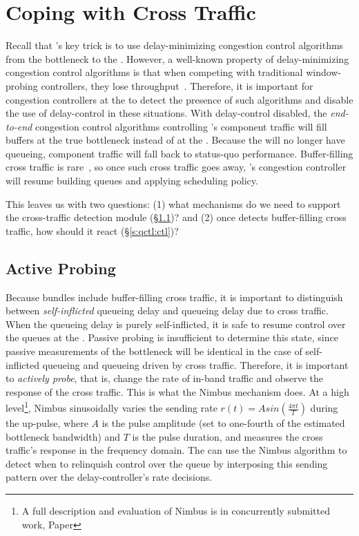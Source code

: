 \section{Coping with Cross Traffic}\label{s:queue-ctl}

Recall that \name's key trick is to use delay-minimizing congestion control algorithms from the bottleneck to the \inbox.
However, a well-known property of delay-minimizing congestion control algorithms is that when competing with traditional window-probing controllers, they lose throughput~\cite{copa}.
Therefore, it is important for congestion controllers at the \inbox to detect the presence of such algorithms and disable the use of delay-control in these situations.
With delay-control disabled, the \emph{end-to-end} congestion control algorithms controlling \name's component traffic will fill buffers at the true bottleneck instead of at the \inbox.
Because the \inbox will no longer have queueing, component traffic will fall back to status-quo performance.
Buffer-filling cross traffic is rare~\cite{something}, so once such cross traffic goes away, \name's congestion controller will resume building queues and applying scheduling policy.

This leaves us with two questions: 
(1) what mechanisms do we need to support the cross-traffic detection module (\S\ref{s:qctl:nimbus})? and
(2) once \name detects buffer-filling cross traffic, how should it react (\S\ref{s:qctl:ctl})? 

\subsection{Active Probing}\label{s:qctl:nimbus}
Because bundles include buffer-filling cross traffic, it is important to distinguish between \emph{self-inflicted} queueing delay and queueing delay due to cross traffic.
When the queueing delay is purely self-inflicted, it is safe to resume control over the queues at the \inbox.
Passive probing is insufficient to determine this state, since passive measurements of the bottleneck will be identical in the case of self-inflicted queueing and queueing driven by cross traffic.
Therefore, it is important to \emph{actively probe}, that is, change the rate of in-band traffic and observe the response of the cross traffic. 
This is what the Nimbus mechanism does.
At a high level\footnote{A full description and evaluation of Nimbus is in concurrently submitted work, Paper }, 
Nimbus sinusoidally varies the sending rate $r(t) = A sin(\frac{4\pi{}t}{T})$ during the up-pulse, where $A$ is the pulse amplitude (set to one-fourth of the estimated bottleneck bandwidth) and $T$ is the pulse duration, and measures the cross traffic's response in the frequency domain.
The \inbox can use the Nimbus algorithm to detect when to relinquish control over the queue by interposing this sending pattern over the delay-controller's rate decisions.


